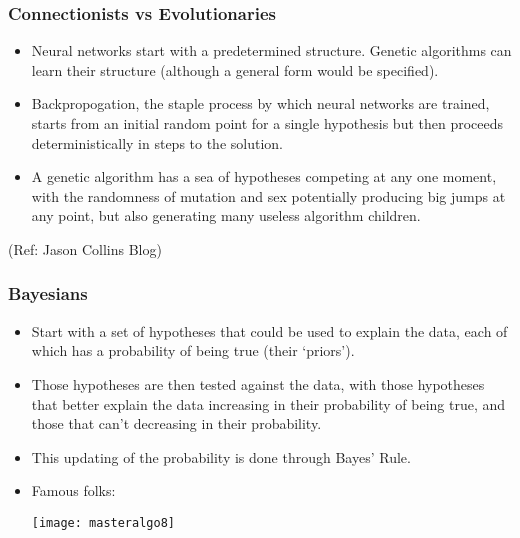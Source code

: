 \begin{frame}[fragile]\frametitle{Connectionists vs Evolutionaries}
  \begin{itemize}
    \item Neural networks start with a predetermined structure. Genetic algorithms can learn their structure (although a general form would be specified). 
	\item Backpropogation, the staple process by which neural networks are trained, starts from an initial random point for a single hypothesis but then proceeds deterministically in steps to the solution. 
	\item A genetic algorithm has a sea of hypotheses competing at any one moment, with the randomness of mutation and sex potentially producing big jumps at any point, but also generating many useless algorithm children.
  \end{itemize}

{\tiny (Ref: Jason Collins Blog)}
\end{frame}

\begin{frame}[fragile]\frametitle{Bayesians}
  \begin{itemize}
    \item Start with a set of hypotheses that could be used to explain the data, each of which has a probability of being true (their ‘priors’). 
	\item Those hypotheses are then tested against the data, with those hypotheses that better explain the data increasing in their probability of being true, and those that can’t decreasing in their probability. 
	\item This updating of the probability is done through Bayes’ Rule.
	\item Famous folks:
	
	 \begin{center}
\texttt{[image: masteralgo8]}
\end{center}	
  \end{itemize}

\end{frame}

